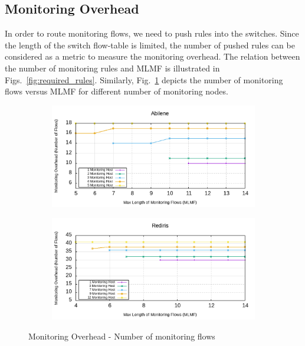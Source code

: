 \documentclass[10pt, journal, letterpaper]{IEEEtran}
\begin{document}
\subsection{Monitoring Overhead}\label{subsec:eval_monitoring_overhead}
In order to route monitoring flows, we need to push rules into the switches. Since the length of the switch flow-table is limited, the number of pushed rules can be considered as a metric to measure the monitoring overhead. The relation between the number of monitoring rules and MLMF is illustrated in Figs.~\ref{fig:required_rules}. Similarly, Fig.~\ref{fig:required_flows} depicts the number of monitoring flows versus MLMF for different number of monitoring nodes. 
\begin{figure}
    \begin{subfigure}{0.48\columnwidth}
      \centering
      \includegraphics[width=\columnwidth]{img/eval_Abilene_Max_Length_of_Routes_Number_of_Required_Flows.png}
    \end{subfigure}
    \begin{subfigure}{0.49\columnwidth}
      \centering
      \includegraphics[width=\columnwidth]{img/eval_Rediris_Max_Length_of_Routes_Number_of_Required_Flows.png}
    \end{subfigure}
    \caption{Monitoring Overhead - Number of monitoring flows}
    \label{fig:required_flows}
\end{figure}
\end{document}
